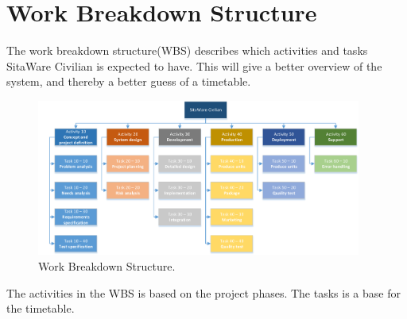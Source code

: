 \chapter{Work Breakdown Structure}

The work breakdown structure(WBS) describes which activities and tasks SitaWare Civilian is expected to have. This will give a better overview of the system, and thereby a better guess of a timetable.

\begin{figure}[H]
\centering
\includegraphics[width=0.95\textwidth]
{Billeder/WBS/WBS_v1.0.pdf}
\caption{Work Breakdown Structure.}
\label{fig:WBS}
\end{figure}

The activities in the WBS is based on the project phases. The tasks is a base for the timetable.

